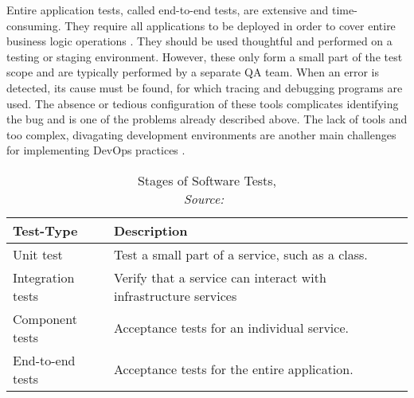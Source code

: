        Entire application tests, called end-to-end tests, are extensive and time-consuming. They require all applications to be deployed in order to cover entire business logic operations \cite{microtest}. They should be used thoughtful and performed on a testing or staging environment. However, these only form a small part of the test scope and are typically performed by a separate \ac{QA} team. When an error is detected, its cause must be found, for which tracing and debugging programs are used. The absence or tedious configuration of these tools complicates identifying the bug and is one of the problems already described above. The lack of tools and too complex, divagating development environments are another main challenges for implementing DevOps practices \cite{devops_challenge}.

        \begin{table}
            \centering
            \begin{tabularx}{0.9\textwidth}{lX}
                Test-Type & Description \\ \midrule\midrule
                Unit test & Test a small part of a service, such as a class.\\
                Integration tests & Verify that a service can interact with infrastructure services \\
                Component tests & Acceptance tests for an individual service. \\
                End-to-end tests & Acceptance tests for the entire application.
            \end{tabularx}
            \caption{Stages of Software Tests, \\\textit{Source:~\cite{microtest}}}\label{tab::tests}
        \end{table}


